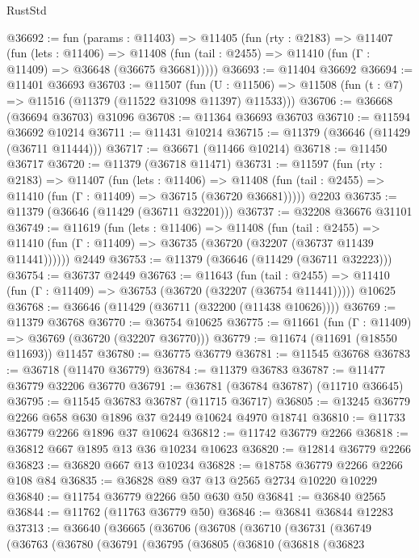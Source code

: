 \begin{lexlean}{RustStd}
\begin{coremodule}
@36692 := fun (params : @11403) =>
  @11405
    (fun (rty : @2183) =>
    @11407
      (fun (lets : @11406) =>
      @11408 (fun (tail : @2455) => @11410 (fun (Γ : @11409) => @36648 (@36675 @36681)))))
@36693 := @11404 @36692
@36694 := @11401 @36693
@36703 := @11507
    (fun (U : @11506) => @11508 (fun (t : @7) => @11516 (@11379 (@11522 @31098 @11397) @11533)))
@36706 := @36668 (@36694 @36703) @31096
@36708 := @11364 @36693 @36703
@36710 := @11594 @36692 @10214
@36711 := @11431 @10214
@36715 := @11379 (@36646 (@11429 (@36711 @11444)))
@36717 := @36671 (@11466 @10214)
@36718 := @11450 @36717
@36720 := @11379 (@36718 @11471)
@36731 := @11597
    (fun (rty : @2183) =>
    @11407
      (fun (lets : @11406) =>
      @11408 (fun (tail : @2455) => @11410 (fun (Γ : @11409) => @36715 (@36720 @36681)))))
    @2203
@36735 := @11379 (@36646 (@11429 (@36711 @32201)))
@36737 := @32208 @36676 @31101
@36749 := @11619
    (fun (lets : @11406) =>
    @11408
      (fun (tail : @2455) =>
      @11410 (fun (Γ : @11409) => @36735 (@36720 (@32207 (@36737 @11439 @11441))))))
    @2449
@36753 := @11379 (@36646 (@11429 (@36711 @32223)))
@36754 := @36737 @2449
@36763 := @11643
    (fun (tail : @2455) => @11410 (fun (Γ : @11409) => @36753 (@36720 (@32207 (@36754 @11441)))))
    @10625
@36768 := @36646 (@11429 (@36711 (@32200 (@11438 @10626))))
@36769 := @11379 @36768
@36770 := @36754 @10625
@36775 := @11661 (fun (Γ : @11409) => @36769 (@36720 (@32207 @36770)))
@36779 := @11674 (@11691 (@18550 @11693)) @11457
@36780 := @36775 @36779
@36781 := @11545 @36768
@36783 := @36718 (@11470 @36779)
@36784 := @11379 @36783
@36787 := @11477 @36779 @32206 @36770
@36791 := @36781 (@36784 @36787) (@11710 @36645)
@36795 := @11545 @36783 @36787 (@11715 @36717)
@36805 := @13245 @36779 @2266 @658 @630 @1896 @37 @2449 @10624 @4970 @18741
@36810 := @11733 @36779 @2266 @1896 @37 @10624
@36812 := @11742 @36779 @2266
@36818 := @36812 @667 @1895 @13 @36 @10234 @10623
@36820 := @12814 @36779 @2266
@36823 := @36820 @667 @13 @10234
@36828 := @18758 @36779 @2266 @2266 @108 @84
@36835 := @36828 @89 @37 @13 @2565 @2734 @10220 @10229
@36840 := @11754 @36779 @2266 @50 @630 @50
@36841 := @36840 @2565
@36844 := @11762 (@11763 @36779 @50)
@36846 := @36841 @36844 @12283
@37313 := @36640
    (@36665
      (@36706
        (@36708
          (@36710
            (@36731
              (@36749
                (@36763
                  (@36780
                    (@36791
                      (@36795
                        (@36805
                          (@36810
                            (@36818
                              (@36823

\end{coremodule}
\end{lexlean}
